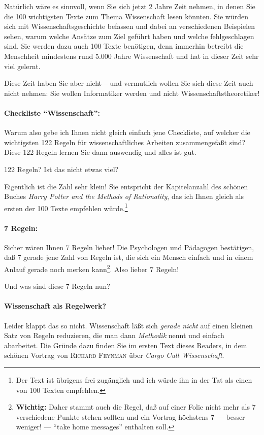 Natürlich wäre es sinnvoll, wenn Sie sich jetzt 2 Jahre Zeit nehmen, in denen Sie
die 100 wichtigsten Texte zum Thema Wissenschaft lesen könnten. 
Sie würden sich mit Wissenschaftsgeschichte befassen und dabei an verschiedenen
Beispielen sehen, warum welche Ansätze zum Ziel geführt haben und welche
fehlgeschlagen sind. Sie werden dazu auch 100 Texte benötigen, denn immerhin betreibt die Menschheit
mindestens rund 5.000 Jahre Wissenschaft und hat in dieser Zeit sehr viel gelernt.

Diese Zeit
haben Sie aber nicht -- und vermutlich wollen Sie sich diese Zeit auch nicht nehmen:
Sie wollen Informatiker werden und nicht Wissenschafts\-theoretiker!

\paragraph{Checkliste \enquote{Wissenschaft}:}
Warum also gebe ich Ihnen nicht gleich einfach jene Checkliste, auf welcher die
wichtigsten 122 Regeln für wissen\-schaft\-li\-ches Arbeiten zusammengefaßt sind? Diese 122 Regeln
lernen
Sie dann auswendig und alles ist gut.

122 Regeln? Ist das nicht etwas viel?

Eigentlich ist die Zahl sehr klein! Sie entspricht der Kapitelanzahl
des schönen Buches \textit{Harry Potter and the Methods of Rationality}, das
ich Ihnen gleich als ersten der 100 Texte empfehlen würde.\footnote{Der Text 
ist übrigens \href{http://www.hpmor.com/}{\online} frei zugänglich und ich
würde ihn in der Tat als einen von 100 Texten empfehlen.}

\paragraph{7 Regeln:}
Sicher wären Ihnen 7 Regeln lieber! Die
Psychologen und Päda\-go\-gen bestätigen, daß 7 gerade jene Zahl von Regeln ist, die
sich ein Mensch einfach und in einem Anlauf gerade noch merken kann\footnote{\textbf{Wichtig:} Daher stammt auch die Regel, daß auf einer Folie
nicht mehr als 7 verschiedene Punkte stehen sollten und ein Vortrag höchstens 7 --- besser weniger! --- \enquote{take home messages}
enthalten soll.}.
Also lieber 7 Regeln! 

Und was sind diese 7 Regeln nun?

\paragraph{Wissenschaft als Regelwerk?}
Leider klappt das so nicht. Wissenschaft läßt sich
\textit{gerade nicht} auf einen kleinen Satz von Regeln reduzieren,
die man dann \textit{Methodik} nennt und einfach abarbeitet.
Die Gründe dazu finden Sie im ersten Text dieses Readers, in dem schönen
Vortrag von \textsc{Richard Feynman} über \textit{Cargo Cult Wissenschaft}.

